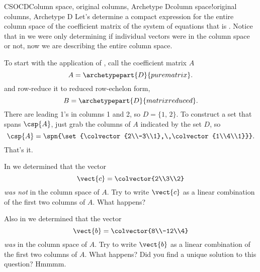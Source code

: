 \begin{example}{CSOCD}{Column space, original columns, Archetype D}{column space!original columns,  Archetype D}
Let's determine a compact expression for the entire column space of the coefficient matrix of the system of equations that is .  Notice that in  we were only determining if individual vectors were in the column space or not, now we are describing the entire column space.\par
%
To start with the application of , call the coefficient matrix $A$
%
\begin{equation*}
A=\archetypepart{D}{purematrix}.
\end{equation*}
%
and row-reduce it to reduced row-echelon form,
%
\begin{equation*}
B=\archetypepart{D}{matrixreduced}.
\end{equation*}
%
There are leading 1's in columns 1 and 2, so $D=\{1,\,2\}$.  To construct a set that spans $\csp{A}$, just grab the columns of $A$ indicated by the set $D$, so
%
\begin{equation*}
\csp{A}=\spn{\set{\colvector{2\\-3\\1},\,\colvector{1\\4\\1}}}.
\end{equation*}
%
That's it.\par
%
In  we determined that the vector
%
\begin{equation*}
\vect{c}=\colvector{2\\3\\2}
\end{equation*}
%
{\em was not} in the column space of $A$.  Try to write $\vect{c}$ as a linear combination of the first two columns of $A$.  What happens?\par
%
Also in  we determined that the vector
%
\begin{equation*}
\vect{b}=\colvector{8\\-12\\4}
\end{equation*}
%
{\em was} in the column space of $A$.  Try to write $\vect{b}$ as a linear combination of the first two columns of $A$.  What happens?  Did you find a unique solution to this question?  Hmmmm.
%
\end{example}
%

